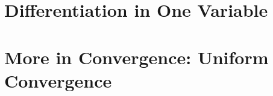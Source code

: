 \documentclass{myBook}
\begin{document}
\part{Differentiation in One Variable}





\part{More in Convergence: Uniform Convergence}

\appendix








\end{document}
